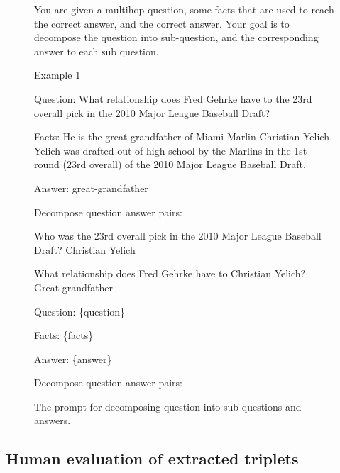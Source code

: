 \documentclass{article} %
\begin{document}
\begin{figure}[!ht]
\tiny
\begin{mdframed}

You are given a multihop question, some facts that are used to reach the correct answer, and the correct answer. Your goal is to decompose the question into sub-question, and the corresponding answer to each sub question. 

Example 1

Question:
What relationship does Fred Gehrke have to the 23rd overall pick in the 2010 Major League Baseball Draft?

Facts:
He is the great-grandfather of Miami Marlin Christian Yelich
Yelich was drafted out of high school by the Marlins in the 1st round (23rd overall) of the 2010 Major League Baseball Draft.

Answer:
great-grandfather

Decompose question answer pairs:

Who was the 23rd overall pick in the 2010 Major League Baseball Draft? Christian Yelich

What relationship does Fred Gehrke have to Christian Yelich? Great-grandfather


Question:
\{question\}

Facts:
\{facts\}

Answer:
\{answer\}

Decompose question answer pairs:
\end{mdframed}
\caption{The prompt for decomposing question into sub-questions and answers.}
\label{prompt-decomposition}
\end{figure}


\subsection{Human evaluation of extracted triplets}
\label{app:kg-coverage-human-eval}

\end{document}
